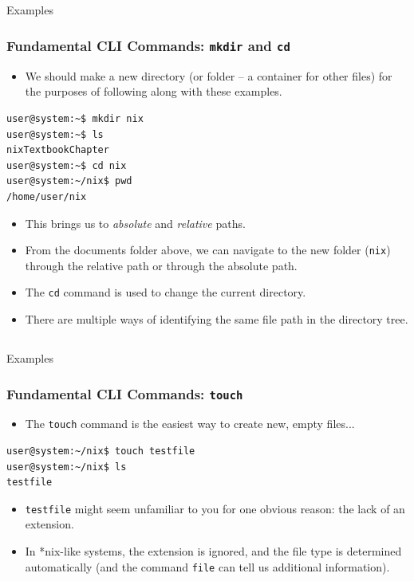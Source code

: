 \documentclass[10pt]{beamer}
\begin{document}
\subsection{}
\begin{frame}[fragile]{Examples}
\frametitle{Fundamental CLI Commands: \texttt{mkdir} and \texttt{cd}}
\begin{itemize}
\item We should make a new directory (or folder -- a container for other files) for the purposes of following along with these examples. \vspace{0.2in}
\end{itemize}
\begin{lstlisting}[style=BashInputStyle]
user@system:~$ mkdir nix
user@system:~$ ls
nixTextbookChapter
user@system:~$ cd nix
user@system:~/nix$ pwd
/home/user/nix
\end{lstlisting}
\vspace{0.1in}
\begin{itemize} 
\item This brings us to \emph{absolute} and \emph{relative} paths. \vspace{0.1in}
\item From the documents folder above, we can navigate to the new folder (\texttt{nix}) through the relative path or through the absolute path. \vspace{0.1in}
\item The \texttt{cd} command is used to change the current directory.\vspace{0.1in}
\item There are multiple ways of identifying the same file path in the directory tree.\vspace{0.1in}
\end{itemize}
\end{frame}

\subsection{}
\begin{frame}[fragile]{Examples}
\frametitle{Fundamental CLI Commands: \texttt{touch}}
\begin{itemize}
\item The \texttt{touch} command is the easiest way to create new, empty files...
\end{itemize}
\begin{lstlisting}[style=BashInputStyle]
user@system:~/nix$ touch testfile
user@system:~/nix$ ls
testfile
\end{lstlisting}
\vspace{0.1in}
\begin{itemize}
\item \texttt{testfile} might seem unfamiliar to you for one obvious reason: the lack of an extension. \vspace{0.1in}
\item  In *nix-like systems, the extension is ignored, and the file type is determined automatically (and the command \texttt{file} can tell us additional information).\vspace{0.1in}
\end{itemize}
\end{frame}
\end{document}
